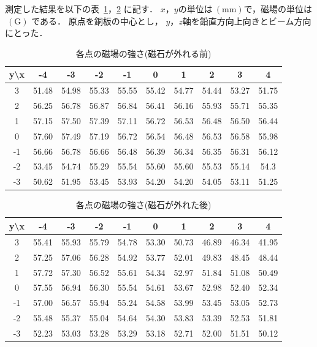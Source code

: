 測定した結果を以下の表~\ref{MF1}，\ref{MF2} に記す．
$x，y$の単位は$~(\mathrm{mm} )$で，磁場の単位は$~(\mathrm{G})$ である．
原点を銅板の中心とし， $y，z$軸を鉛直方向上向きとビーム方向にとった．
\begin{table}[H]
  \begin{center}
    \caption{各点の磁場の強さ(磁石が外れる前)}\label{MF1}
    \begin{tabular}{|c||c|c|c|c|c|c|c|c|c|}\hline
       y\textbackslash x & -4 & -3 & -2 & -1 & 0 & 1 & 2 & 3 & 4 \\ \hline \hline
      3 & 51.48 & 54.98 & 55.33 & 55.55 & 55.42 & 54.77 & 54.44 & 53.27 & 51.75 \\ \hline
      2 & 56.25 & 56.78 & 56.87 & 56.84 & 56.41 & 56.16 & 55.93 & 55.71 & 55.35 \\ \hline
      1 & 57.15 & 57.50 & 57.39 & 57.11 & 56.72 & 56.53 & 56.48 & 56.50 & 56.44 \\ \hline
      0 & 57.60 & 57.49 & 57.19 & 56.72 & 56.54 & 56.48 & 56.53 & 56.58 & 55.98 \\ \hline
      -1 & 56.66 & 56.78 & 56.66 & 56.48 & 56.39 & 56.34 & 56.35 & 56.31 & 56.12 \\ \hline
      -2 & 53.45 & 54.74 & 55.29 & 55.54 & 55.60 & 55.60 & 55.53 & 55.14 & 54.3 \\ \hline
      -3 & 50.62 & 51.95 & 53.45 & 53.93 & 54.20 & 54.20 & 54.05 & 53.11 & 51.25 \\ \hline
    \end{tabular}
  \end{center}
\end{table}
\begin{table}[H]
  \begin{center}
    \caption{各点の磁場の強さ(磁石が外れた後)}\label{MF2}
    \begin{tabular}{|c||c|c|c|c|c|c|c|c|c|}\hline
       y\textbackslash x & -4 & -3 & -2 & -1 & 0 & 1 & 2 & 3 & 4 \\ \hline \hline
      3 & 55.41 & 55.93 & 55.79 & 54.78 & 53.30 & 50.73 & 46.89 & 46.34 & 41.95 \\ \hline
      2 & 57.25 & 57.06 & 56.28 & 54.92 & 53.77 & 52.01 & 49.83 & 48.45 & 48.44 \\ \hline
      1 & 57.72 & 57.30 & 56.52 & 55.61 & 54.34 & 52.97 & 51.84 & 51.08 & 50.49 \\ \hline
      0 & 57.55 & 56.94 & 56.30 & 55.54 & 54.61 & 53.67 & 52.98 & 52.40 & 52.34 \\ \hline
      -1 & 57.00 & 56.57 & 55.94 & 55.24 & 54.58 & 53.99 & 53.45 & 53.05 & 52.73 \\ \hline
      -2 & 55.48 & 55.37 & 55.04 & 54.64 & 54.30 & 53.83 & 53.39 & 52.53 & 51.81 \\ \hline
      -3 & 52.23 & 53.03 & 53.28 & 53.29 & 53.18 & 52.71 & 52.00 & 51.51 & 50.12 \\ \hline
 \end{tabular}
  \end{center}
\end{table}
